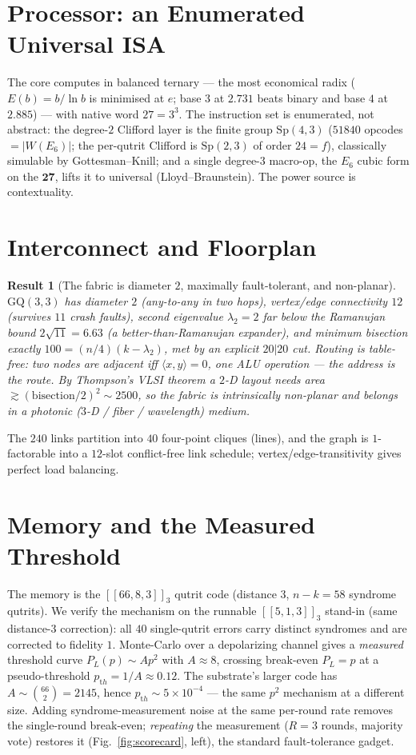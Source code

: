\documentclass[11pt]{article}
\newtheorem{result}{Result}
\begin{document}
\section{Processor: an Enumerated Universal ISA}
The core computes in balanced ternary --- the most economical radix ($E(b)=b/\ln b$ is minimised at
$e$; base $3$ at $2.731$ beats binary and base $4$ at $2.885$) --- with native word $27=3^3$. The
instruction set is enumerated, not abstract: the degree-$2$ Clifford layer is the finite group
$\mathrm{Sp}(4,3)$ ($51840$ opcodes $=|W(E_6)|$; the per-qutrit Clifford is $\mathrm{Sp}(2,3)$ of order
$24=f$), classically simulable by Gottesman--Knill; and a single degree-$3$ macro-op, the $E_6$ cubic
form on the $\mathbf{27}$, lifts it to universal (Lloyd--Braunstein). The power source is contextuality.

\section{Interconnect and Floorplan}
\begin{result}[The fabric is diameter $2$, maximally fault-tolerant, and non-planar]
$\mathrm{GQ}(3,3)$ has diameter $2$ (any-to-any in two hops), vertex/edge connectivity $12$ (survives
$11$ crash faults), second eigenvalue $\lambda_2=2$ far below the Ramanujan bound $2\sqrt{11}=6.63$ (a
\emph{better}-than-Ramanujan expander), and minimum bisection \emph{exactly} $100=(n/4)(k-\lambda_2)$,
met by an explicit $20|20$ cut. Routing is table-free: two nodes are adjacent iff
$\langle x,y\rangle=0$, one ALU operation --- the address \emph{is} the route. By Thompson's VLSI
theorem a $2$-D layout needs area $\gtrsim(\mathrm{bisection}/2)^2\sim2500$, so the fabric is
intrinsically non-planar and belongs in a photonic ($3$-D / fiber / wavelength) medium.
\end{result}
The $240$ links partition into $40$ four-point cliques (lines), and the graph is $1$-factorable into a
$12$-slot conflict-free link schedule; vertex/edge-transitivity gives perfect load balancing.

\section{Memory and the Measured Threshold}
The memory is the $[[66,8,3]]_3$ qutrit code (distance $3$, $n-k=58$ syndrome qutrits). We verify the
mechanism on the runnable $[[5,1,3]]_3$ stand-in (same distance-$3$ correction): all $40$ single-qutrit
errors carry distinct syndromes and are corrected to fidelity $1$. Monte-Carlo over a depolarizing
channel gives a \emph{measured} threshold curve $P_L(p)\sim A p^2$ with $A\approx8$, crossing break-even
$P_L=p$ at a pseudo-threshold $p_{\mathrm th}=1/A\approx0.12$. The substrate's larger code has
$A\sim\binom{66}{2}=2145$, hence $p_{\mathrm th}\sim5\times10^{-4}$ --- the same $p^2$ mechanism at a
different size. Adding syndrome-measurement noise at the same per-round rate removes the single-round
break-even; \emph{repeating} the measurement ($R=3$ rounds, majority vote) restores it
(Fig.~\ref{fig:scorecard}, left), the standard fault-tolerance gadget.
\end{document}
